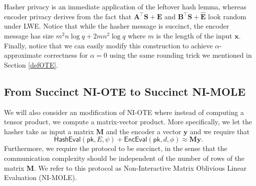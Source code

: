 \documentclass{article}
\newcommand{\algofont}[1]{\ensuremath{\mathsf{#1}}}
\newcommand{\Enc}{{\algofont{Enc}}}
\newcommand{\Eval}{\algofont{Eval}\xspace}
\newcommand{\Hash}{{\algofont{Hash}}}
\newcommand{\pk}{{\mathsf{pk}}}
\begin{document}
{
Hasher privacy is an immediate application of the leftover hash lemma, whereas encoder privacy derives from the fact that $\mathbf{A}^\intercal \mathbf{S}+ \mathbf{E}$ and $\mathbf{B}^\intercal \mathbf{S}+ \hat{\mathbf{E}}$ look random under LWE. Notice that while the hasher message is succinct, the encoder message has size $m^2n\log q+2mn^2\log q$ where $m$ is the length of the input $\mathbf{x}$. Finally, notice that we can easily modify this construction to achieve $\alpha$-approximate correctness for $\alpha=0$ using the same rounding trick we mentioned in Section \ref{defOTE}.}
\subsection{From Succinct NI-OTE to Succinct NI-MOLE}\label{sec:MOLE}

We will also consider an modification of NI-OTE where instead of computing a tensor product, we compute a matrix-vector product. More specifically, we let the hasher take as input a matrix $\mathbf{M}$ and the encoder a vector $\mathbf{y}$ and we require that
\[
\Hash\Eval(\pk, E, \psi)+\Enc\Eval(\pk, d, \phi) \approx \mathbf{M} \mathbf{y}.
\]
Furthermore, we require the protocol to be succinct, in the sense that the communication complexity should be independent of the number of rows of the matrix $\mathbf{M}$. We refer to this protocol as Non-Interactive Matrix Oblivious Linear Evaluation (NI-MOLE).
\end{document}

